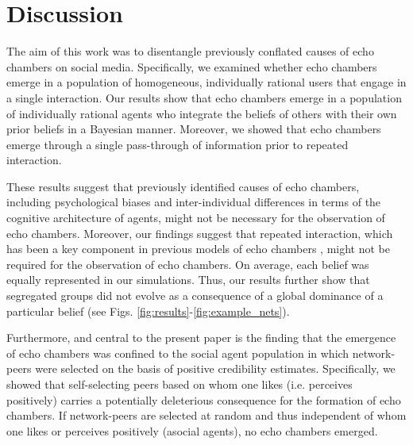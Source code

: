 \documentclass[fleqn,10pt]{wlscirep}
\begin{document}
\section*{Discussion}
The aim of this work was to disentangle previously conflated causes of echo chambers on social media. Specifically, we examined whether echo chambers emerge in a population of homogeneous, individually rational users that engage in a single interaction. Our results show that echo chambers emerge in a population of individually rational agents who integrate the beliefs of others with their own prior beliefs in a Bayesian manner. Moreover, we showed that echo chambers emerge through a single pass-through of information prior to repeated interaction.

These results suggest that previously identified causes of echo chambers, including psychological biases and inter-individual differences in terms of the cognitive architecture of agents, might not be necessary for the observation of echo chambers. Moreover, our findings suggest that repeated interaction, which has been a key component in previous models of echo chambers \cite{madsen2017growing, madsen2018large}, might not be required for the observation of echo chambers. On average, each belief was equally represented in our simulations. Thus, our results further show that segregated groups did not evolve as a consequence of a global dominance of a particular belief (see Figs. \ref{fig:results}-\ref{fig:example_nets}). 

Furthermore, and central to the present paper is the finding that the emergence of echo chambers was confined to the social agent population in which network-peers were selected on the basis of positive credibility estimates. Specifically, we showed that self-selecting peers based on whom one likes (i.e. perceives positively) carries a potentially deleterious consequence for the formation of echo chambers. If network-peers are selected at random and thus independent of whom one likes or perceives positively (asocial agents), no echo chambers emerged.
\end{document}
